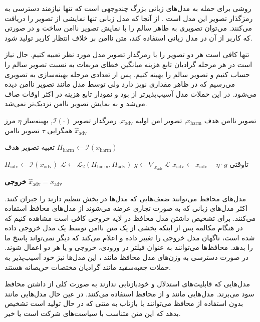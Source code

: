
روشی برای حمله به مدل‌های زبانی بزرگ چندوجهی است که تنها نیازمند دسترسی به رمزگذار تصویر این مدل است . از آنجا که مدل زبانی تنها نمایشی از تصویر را دریافت می‌کنند. می‌توان تصویری به ظاهر سالم را با نمایش تصویر ناامن ساخت و در صورتی که کاربر از آن در مدل زبانی استفاده کند، متن ناامن بر خلاف انتظار کاربر تولید شود.



تنها کافی است هر دو تصویر را با رمزگذار تصویر مدل مورد نظر تعبیه کنیم. حال نیاز است در هر مرحله گرادیان تابع هزینه میانگین خطای مربعات به نسبت تصویر سالم را حساب کنیم و تصویر سالم را بهینه کنیم. پس از تعدادی مرحله بهینه‌سازی به تصویری می‌رسیم که در ظاهر مقداری نویز دارد ولی توسط مدل مانند تصویر ناامن دیده می‌شود. در این حملات مدل  آسیب‌پذیرتر از  بود و نمودار تابع هزینه  در اکثر اوقات صاف می‌شد و به نمایش تصویر ناامن نزدیک‌تر نمی‌شد.

 تصویر ناامن هدف $x_{\mathrm{harm}}$, تصویر امن اولیه $x_{\mathrm{adv}}$, رمزگذار تصویر $\mathcal{I}(\cdot)$, بهینه‌ساز $\eta$
 مرز همگرایی $\tau$
 تصویر ناامن $\hat{x}_{\mathrm{adv}}$

 تعبیه تصویر هدف
 $H_{\mathrm{harm}} \gets \mathcal{I}(x_{\mathrm{harm}})$

     $H_{\mathrm{adv}} \gets \mathcal{I}(x_{\mathrm{adv}})$
     $\mathcal{L} \gets \mathcal{L}_{2}(H_{\mathrm{harm}}, H_{\mathrm{adv}})$ 
     $g \gets \nabla_{x_{\mathrm{adv}}}\,\mathcal{L}$
     $x_{\mathrm{adv}} \gets x_{\mathrm{adv}} - \eta \cdot g$
‌تاوقتی

 \textbf{خروجی} $\hat{x}_{\mathrm{adv}} = x_{\mathrm{adv}}$


مدل‌های محافظ می‌توانند ضعف‌هایی که مدل‌ها در بخش تنظیم دارند را جبران کنند. اکثر مدل‌های زبانی که به صورت تجاری عرضه می‌شوند از مدل‌های محافظ استفاده می‌کنند. برای تشخیص داشتن مدل محافظ در لایه خروجی کافی است مشاهده کنیم که در هنگام مکالمه پس از اینکه بخشی از یک متن ناامن توسط یک مدل خروجی داده شده است، ناگهان مدل خروجی را تغییر داده و اعلام می‌کند که دیگر نمی‌تواند پاسخ ما را بدهد. محافظ‌ها می‌توانند به عنوان فیلتر در ورودی، خروجی و یا هر دو اعمال شوند. در صورت دسترسی به وزن‌های مدل محافظ مانند ، این مدل‌ها نیز خود آسیب‌پذیر به حملات جعبه‌سفید مانند گرادیان مختصات حریصانه هستند.

مدل‌هایی که قابلیت‌های استدلال و خودبازتابی ندارند به صورت کلی از داشتن محافظ سود می‌برند. مدل‌هایی مانند  و  از محافظ استفاده می‌کنند. در عین حال مدل‌هایی مانند  بدون استفاده از محافظ می‌توانند با بازتاب به متنی که در حال تولید است تشخیص بدهد که این متن متناسب با سیاست‌های شرکت است یا خیر.

